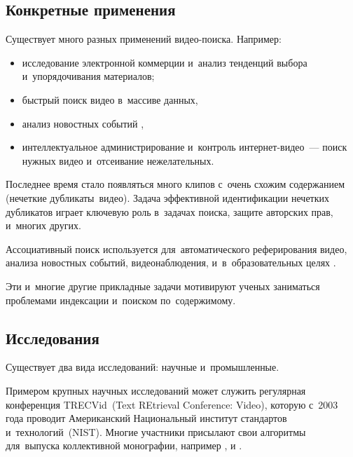 \subsection{Конкретные применения}

Существует много разных применений видео-поиска. Например:
\begin{itemize}
    \item исследование электронной коммерции
        и~анализ тенденций выбора и~упорядочивания материалов;
    \item быстрый поиск видео в~массиве данных,
    \item анализ новостных событий \cite{Peng:2005},
    \item интеллектуальное администрирование и~контроль интернет-видео~—
        поиск нужных видео и~отсеивание нежелательных.
\end{itemize}

Последнее время стало появляться много клипов
с~очень схожим содержанием (нечеткие
дубликаты\ видео).
Задача эффективной идентификации нечетких дубликатов играет ключевую
роль в~задачах поиска, защите авторских прав, и~многих других.

Ассоциативный поиск используется для~автоматического
реферирования видео, анализа новостных событий,
видеонаблюдения, и~в~образовательных целях \cite{Dimitrova:2002}.

Эти и~многие другие прикладные задачи мотивируют ученых заниматься
проблемами индексации и~поиском по~содержимому.

\subsection{Исследования}

Существует два вида исследований: научные и~промышленные.

Примером крупных научных исследований может служить
регулярная конференция TRECVid~(Text REtrieval Conference: Video),
которую с~2003 года проводит Американский Национальный институт
стандартов и~технологий~(NIST).
Многие участники присылают свои алгоритмы для~выпуска коллективной монографии,
например \cite{Over:2011}, \cite{Awad:2014} и \cite{Smeaton:2010}.


